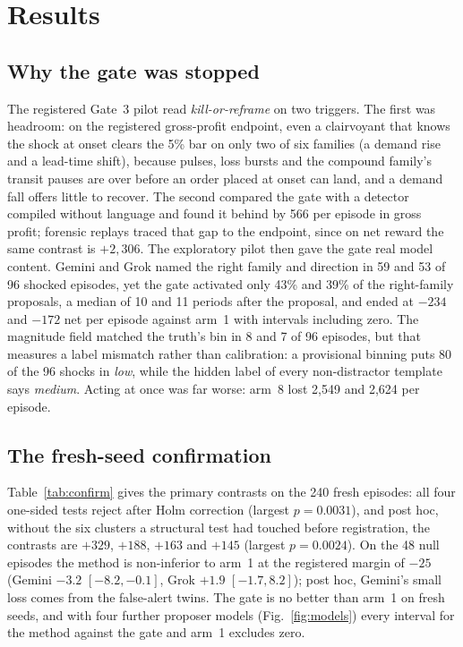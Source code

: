 \section{Results}
\label{sec:results}
\label{sec:experiments}

\subsection{Why the gate was stopped}

The registered Gate~3 pilot read \emph{kill-or-reframe} on two triggers. The first was
headroom: on the registered gross-profit endpoint, even a clairvoyant that knows the shock at
onset clears the 5\% bar
on only two of six families (a demand rise and a lead-time shift), because pulses, loss bursts
and the compound family's transit pauses are over before an order placed at onset can land, and
a demand fall offers little to recover. The second compared the gate with a detector compiled
without language and found it behind by 566 per episode in gross profit; forensic replays traced
that gap to the endpoint, since on net reward the same contrast is $+2{,}306$. The exploratory
pilot then gave the gate real model content. Gemini and Grok named the right family and
direction in 59 and 53 of 96 shocked episodes, yet the gate
activated only 43\% and 39\% of the right-family proposals, a median of 10 and 11 periods after
the proposal, and ended at $-234$ and $-172$ net per episode against arm~1 with intervals
including zero. The magnitude field matched the truth's bin in 8 and 7 of 96 episodes, but
that measures a label mismatch rather than calibration: a provisional binning puts 80 of the 96
shocks in \emph{low}, while the hidden label of every non-distractor template says
\emph{medium}. Acting at once was
far worse: arm~8 lost 2{,}549 and 2{,}624 per episode.

\subsection{The fresh-seed confirmation}

Table~\ref{tab:confirm} gives the primary contrasts on the 240 fresh episodes: all four
one-sided tests reject after Holm correction (largest $p = 0.0031$), and post hoc, without the six
clusters a structural test had touched before registration, the contrasts are $+329$, $+188$,
$+163$ and $+145$ (largest $p = 0.0024$). On the 48 null episodes the method is non-inferior to
arm~1 at the registered margin of $-25$ (Gemini $-3.2$ $[-8.2, -0.1]$, Grok $+1.9$
$[-1.7, 8.2]$); post hoc, Gemini's small loss comes from the false-alert twins. The gate is no
better than arm~1 on fresh seeds, and with four further proposer models
(Fig.~\ref{fig:models}) every interval for the method against the gate and arm~1 excludes zero.

